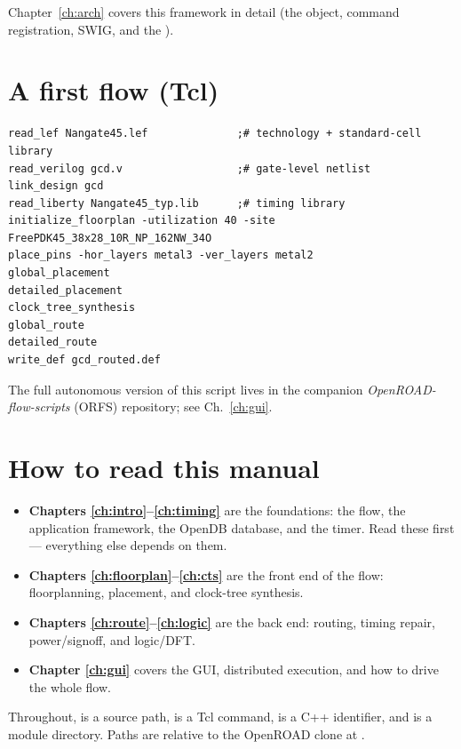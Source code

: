 Chapter~\ref{ch:arch} covers this framework in detail (the  object,
command registration, SWIG, and the ).

\section{A first flow (Tcl)}

\begin{lstlisting}[style=ortcl]
read_lef Nangate45.lef              ;# technology + standard-cell library
read_verilog gcd.v                  ;# gate-level netlist
link_design gcd
read_liberty Nangate45_typ.lib      ;# timing library
initialize_floorplan -utilization 40 -site FreePDK45_38x28_10R_NP_162NW_34O
place_pins -hor_layers metal3 -ver_layers metal2
global_placement
detailed_placement
clock_tree_synthesis
global_route
detailed_route
write_def gcd_routed.def
\end{lstlisting}

The full autonomous version of this script lives in the companion
\emph{OpenROAD-flow-scripts} (ORFS) repository; see Ch.~\ref{ch:gui}.

\section{How to read this manual}

\begin{itemize}
  \item \textbf{Chapters \ref{ch:intro}--\ref{ch:timing}} are the foundations:
        the flow, the application framework, the OpenDB database, and the timer.
        Read these first --- everything else depends on them.
  \item \textbf{Chapters \ref{ch:floorplan}--\ref{ch:cts}} are the front end of
        the flow: floorplanning, placement, and clock-tree synthesis.
  \item \textbf{Chapters \ref{ch:route}--\ref{ch:logic}} are the back end:
        routing, timing repair, power/signoff, and logic/DFT.
  \item \textbf{Chapter \ref{ch:gui}} covers the GUI, distributed execution, and
        how to drive the whole flow.
\end{itemize}

Throughout,  is a source path,  is a
Tcl command,  is a C++ identifier, and  is a module
directory. Paths are relative to the OpenROAD clone at
.

